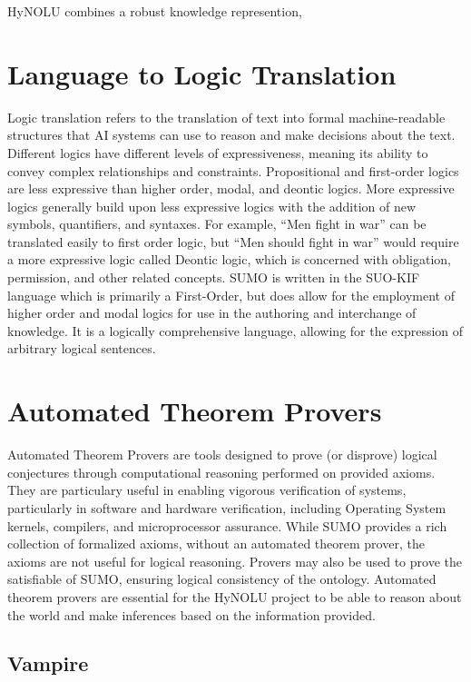 HyNOLU combines a robust knowledge represention, 

\section{Language to Logic Translation}

Logic translation refers to the translation of text into formal machine-readable structures that AI systems can use to reason and make decisions about the text. Different logics have different levels of expressiveness, meaning its ability to convey complex relationships and constraints. Propositional and first-order logics are less expressive than higher order, modal, and deontic logics. More expressive logics generally build upon less expressive logics with the addition of new symbols, quantifiers, and syntaxes. For example, ``Men fight in war'' can be translated easily to first order logic, but ``Men should fight in war'' would require a more expressive logic called Deontic logic, which is concerned with obligation, permission, and other related concepts. SUMO is written in the SUO-KIF language which is primarily a First-Order, but does allow for the employment of higher order and modal logics for use in the authoring and interchange of knowledge. It is a logically comprehensive language, allowing for the expression of arbitrary logical sentences.


\section{Automated Theorem Provers}
Automated Theorem Provers are tools designed to prove (or disprove) logical conjectures through computational reasoning performed on provided axioms. They are particulary useful in enabling vigorous verification of systems, particularly in software and hardware verification, including Operating System kernels, compilers, and microprocessor assurance. While SUMO provides a rich collection of formalized axioms, without an automated theorem prover, the axioms are not useful for logical reasoning. Provers may also be used to prove the satisfiable of SUMO, ensuring logical consistency of the ontology. Automated theorem provers are essential for the HyNOLU project to be able to reason about the world and make inferences based on the information provided.

\subsection{Vampire}

